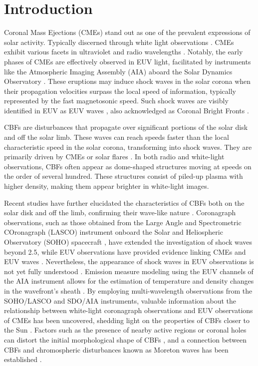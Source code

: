 \section{Introduction}
Coronal Mass Ejections (CMEs) stand out as one of the prevalent expressions of solar activity. Typically discerned through white light observations \citep{vourlidas_2003, zhang_2006, bein_2011}. CMEs exhibit various facets in ultraviolet and radio wavelengths \citep{bastian_2001, veronig_2010}. Notably, the early phases of CMEs are effectively observed in EUV light, facilitated by instruments like the Atmospheric Imaging Assembly (AIA) aboard the Solar Dynamics Observatory \citep[SDO]{lemen_2011, pesnell_2012}. These eruptions may induce shock waves in the solar corona when their propagation velocities surpass the local speed of information, typically represented by the fast magnetosonic speed. Such shock waves are visibly identified in EUV as EUV waves \citep{thompson_1998}, also acknowledged as Coronal Bright Fronts \citep[CBFs]{long_2011}.

CBFs are disturbances that propagate over significant portions of the solar disk and off the solar limb. These waves can reach speeds faster than the local characteristic speed in the solar corona, transforming into shock waves. They are primarily driven by CMEs or solar flares \citep{thompson_1998, veronig_2010, vrsnak_2008, magdaleni_2010, nindos_2011}. In both radio and white-light observations, CBFs often appear as dome-shaped structures moving at speeds on the order of several hundred\kms \citep{pick_2006, nindos_2008, thompson_2009}. These structures consist of piled-up plasma with higher density, making them appear brighter in white-light images.

Recent studies have further elucidated the characteristics of CBFs both on the solar disk and off the limb, confirming their wave-like nature \citep{nitta_2013, long_2011, olmedo_2012}. Coronagraph observations, such as those obtained from the Large Angle and Spectrometric COronagraph (LASCO) instrument onboard the Solar and Heliospheric Observatory (SOHO) spacecraft \citep{domingo_1995}, have extended the investigation of shock waves beyond 2.5\rsun \citep{vourlidas_2003}, while EUV observations have provided evidence linking CMEs and EUV waves \citep{patsourakos_2009}. Nevertheless, the appearance of shock waves in EUV observations is not yet fully understood \citep{kozarev_2011}. Emission measure modeling using the EUV channels of the AIA instrument allows for the estimation of temperature and density changes in the wavefront's sheath \citep{kozarev_2011}. By employing multi-wavelength observations from the SOHO/LASCO and SDO/AIA instruments, valuable information about the relationship between white-light coronagraph observations and EUV observations of CMEs has been uncovered, shedding light on the properties of CBFs closer to the Sun \citep{warmuth_2015}. Factors such as the presence of nearby active regions or coronal holes can distort the initial morphological shape of CBFs \citep{ofman_2002, mann_2003, piantschitsch_2018}, and a connection between CBFs and chromospheric disturbances known as Moreton waves has been established \citep{thompson_1999b}.


